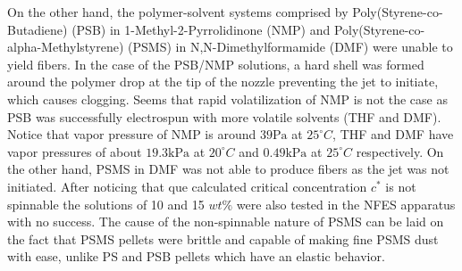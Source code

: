 On the other hand, the polymer-solvent systems comprised by Poly(Styrene-co-Butadiene) (PSB) in 1-Methyl-2-Pyrrolidinone (NMP) and Poly(Styrene-co-alpha-Methylstyrene) (PSMS) in N,N-Dimethylformamide (DMF) were unable to yield fibers. In the case of the PSB/NMP solutions, a hard shell was formed around the polymer drop at the tip of the nozzle preventing the jet to initiate, which causes clogging. Seems that rapid volatilization of NMP is not the case as PSB was successfully electrospun with more volatile solvents (THF and DMF). Notice that vapor pressure of NMP is around $39 \textrm{Pa}$ at $25^{\circ} C$, THF and DMF have vapor pressures of about $19.3 \textrm{kPa}$ at $20^{\circ} C$ and $0.49 \textrm{kPa}$ at $25^{\circ} C$ respectively. \cite{ICSCs} On the other hand, PSMS in DMF was not able to produce fibers as the jet was not initiated. After noticing that que calculated critical concentration $c^*$ is not spinnable the solutions of 10 and 15 $wt\%$ were also tested in the NFES apparatus with no success. The cause of the non-spinnable nature of PSMS can be laid on the fact that PSMS pellets were brittle and capable of making fine PSMS dust with ease, unlike PS and PSB pellets which have an elastic behavior.
